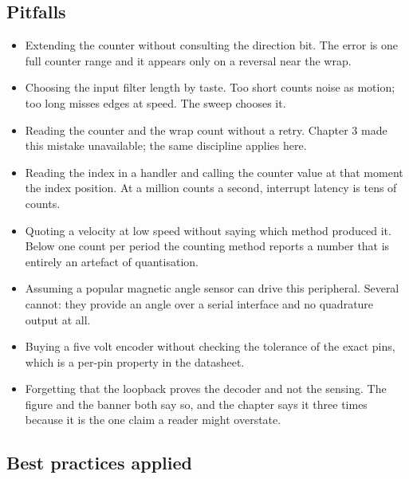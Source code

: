 \subsection*{Pitfalls}

\begin{itemize}
\item Extending the counter without consulting the direction bit. The error is
one full counter range and it appears only on a reversal near the wrap.
\item Choosing the input filter length by taste. Too short counts noise as
motion; too long misses edges at speed. The sweep chooses it.
\item Reading the counter and the wrap count without a retry. Chapter 3 made
this mistake unavailable; the same discipline applies here.
\item Reading the index in a handler and calling the counter value at that
moment the index position. At a million counts a second, interrupt latency is
tens of counts.
\item Quoting a velocity at low speed without saying which method produced it.
Below one count per period the counting method reports a number that is entirely
an artefact of quantisation.
\item Assuming a popular magnetic angle sensor can drive this peripheral.
Several cannot: they provide an angle over a serial interface and no quadrature
output at all.
\item Buying a five volt encoder without checking the tolerance of the exact
pins, which is a per-pin property in the datasheet.
\item Forgetting that the loopback proves the decoder and not the sensing. The
figure and the banner both say so, and the chapter says it three times because
it is the one claim a reader might overstate.
\end{itemize}

\subsection*{Best practices applied}

